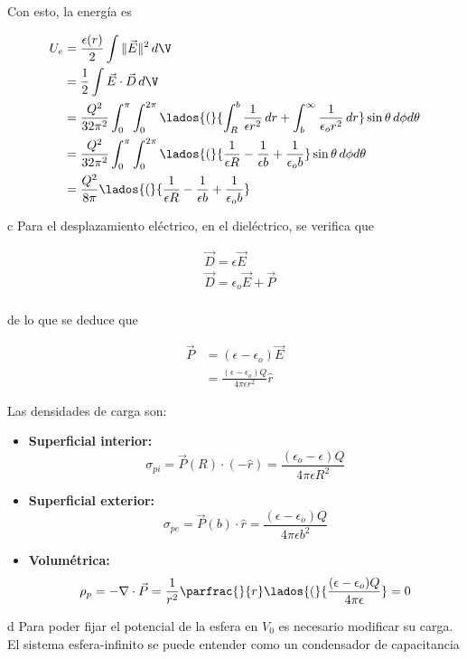\begin{solucion}{9}
Con esto, la energía es

\begin{equation}
\begin{split}
    U_e &=\frac{\epsilon(r)}{2}\int\|\Vec{E}\|^2\,d\V\\
    &= \frac{1}{2}\int\Vec{E}\cdot\Vec{D}\,d\V\\
    &= \frac{Q^2}{32\pi^2}\int^\pi_0\int^{2\pi}_0
    \lados{(}{\int^b_R\frac{1}{\epsilon r^2}
    \,dr+\int^\infty_b\frac{1}{\epsilon_o r^2}\,dr}\sin{\theta}\,d\phi d\theta\\
    &= \frac{Q^2}{32\pi^2}\int^\pi_0\int^{2\pi}_0
    \lados{(}{\frac{1}{\epsilon R}-\frac{1}{\epsilon b}+
    \frac{1}{\epsilon_ob}}\sin{\theta}\,d\phi d\theta\\
    &= \frac{Q^2}{8\pi}\lados{(}{\frac{1}{\epsilon R}-\frac{1}{\epsilon b}+
    \frac{1}{\epsilon_ob}}\\
\end{split}
\nonumber
\end{equation}

\ics c Para el desplazamiento eléctrico, en el dieléctrico, se verifica que

\begin{equation}
\begin{split}
    &\Vec{D}=\epsilon\Vec{E}\\
    &\Vec{D}=\epsilon_o\Vec{E}+\Vec{P}\\
\end{split}
\nonumber
\end{equation}

de lo que se deduce que

\begin{equation}
\begin{split}
    \Vec{P} &= (\epsilon-\epsilon_o)\Vec{E}\\
    &= \frac{(\epsilon-\epsilon_o)Q}{4\pi\epsilon r^2}\hat{r}
\end{split}
\nonumber
\end{equation}

Las densidades de carga son:

\begin{itemize}
    \item \textbf{Superficial interior:}
    \[\sigma_{pi}=\Vec{P}(R)\cdot(-\hat{r})=\frac{(\epsilon_o-\epsilon)Q}{4\pi\epsilon R^2}\]
    \item \textbf{Superficial exterior:}
    \[\sigma_{pe}=\Vec{P}(b)\cdot\hat{r}=\frac{(\epsilon-\epsilon_o)Q}{4\pi\epsilon b^2}\]
    \item \textbf{Volumétrica:}
    \[\rho_p=-\nabla\cdot\Vec{P}=\frac{1}{r^2}\parfrac{}{r}\lados{(}{\frac{(\epsilon-\epsilon_o)Q}{4\pi\epsilon}}=0\]
\end{itemize}
\newpage
\ics d Para poder fijar el potencial de la esfera en $V_0$ es necesario modificar su carga. El sistema esfera-infinito se puede entender como un condensador de capacitancia


\end{solucion}
